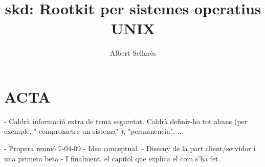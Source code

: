 \documentclass[a4paper]{report}
\author{Albert Sellarès}
\title{skd: Rootkit per sistemes operatius UNIX}
\begin{document}






















\appendix







\section{ACTA}

- Caldrà informació extra de tema seguretat. Caldrà definir-ho tot abans
(per exemple, " comprometre un sistema" ), "permanencia", ...

- Propera reunió 7-04-09
- Idea conceptual.
- Disseny de la part client/servidor i una primera beta
- I finalment, el capítol que explica el com s'ha fet.
\end{document}
